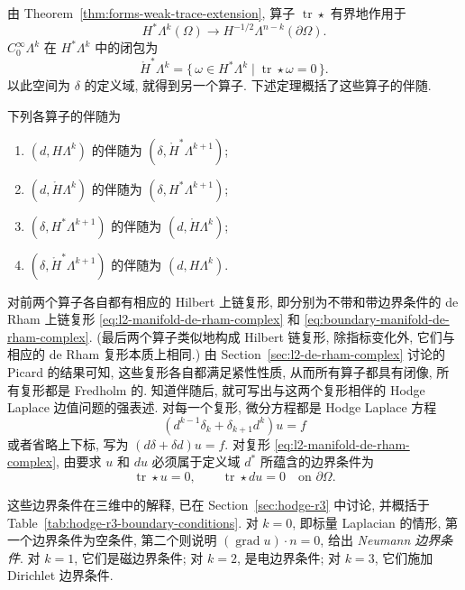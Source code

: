 {由 Theorem~\ref{thm:forms-weak-trace-extension}, 算子 $\operatorname{tr}\star$ 有界地作用于}
\[
H^*\Lambda^k(\Omega)\to H^{-1/2}\Lambda^{n-k}(\partial\Omega).
\]
{$C_0^\infty\Lambda^k$ 在 $H^*\Lambda^k$ 中的闭包为}
\[
\mathring H^*\Lambda^k=\{\,\omega\in H^*\Lambda^k\mid\operatorname{tr}\star\omega=0\,\}.
\]
{以此空间为 $\delta$ 的定义域, 就得到另一个算子. 下述定理概括了这些算子的伴随.}


\begin{Theorem}\label{thm:exterior-codifferential-adjoints}
{下列各算子的伴随为}
\begin{enumerate}
\item{$(d,H\Lambda^k)$ 的伴随为 $(\delta,\mathring H^*\Lambda^{k+1})$;}
\item{$(d,\mathring H\Lambda^k)$ 的伴随为 $(\delta,H^*\Lambda^{k+1})$;}
\item{$(\delta,H^*\Lambda^{k+1})$ 的伴随为 $(d,\mathring H\Lambda^k)$;}
\item{$(\delta,\mathring H^*\Lambda^{k+1})$ 的伴随为 $(d,H\Lambda^k)$.}
\end{enumerate}
\end{Theorem}

{对前两个算子各自都有相应的 Hilbert 上链复形, 即分别为不带和带边界条件的 de Rham 上链复形 \eqref{eq:l2-manifold-de-rham-complex} 和 \eqref{eq:boundary-manifold-de-rham-complex}. (最后两个算子类似地构成 Hilbert 链复形, 除指标变化外, 它们与相应的 de Rham 复形本质上相同.) 由 Section~\ref{sec:l2-de-rham-complex} 讨论的 Picard 的结果可知, 这些复形各自都满足紧性性质, 从而所有算子都具有闭像, 所有复形都是 Fredholm 的. 知道伴随后, 就可写出与这两个复形相伴的 Hodge Laplace 边值问题的强表述. 对每一个复形, 微分方程都是 Hodge Laplace 方程}
\[
(d^{k-1}\delta_k+\delta_{k+1}d^k)u=f
\]
{或者省略上下标, 写为 $(d\delta+\delta d)u=f$. 对复形 \eqref{eq:l2-manifold-de-rham-complex}, 由要求 $u$ 和 $du$ 必须属于定义域 $d^*$ 所蕴含的边界条件为}
\[
\operatorname{tr}\star u=0,\qquad\operatorname{tr}\star du=0\quad\text{on }\partial\Omega.
\]

{这些边界条件在三维中的解释, 已在 Section~\ref{sec:hodge-r3} 中讨论, 并概括于 Table~\ref{tab:hodge-r3-boundary-conditions}. 对 $k=0$, 即标量 Laplacian 的情形, 第一个边界条件为空条件, 第二个则说明 $(\operatorname{grad}u)\cdot n=0$, 给出 \emph{Neumann 边界条件}. 对 $k=1$, 它们是磁边界条件; 对 $k=2$, 是电边界条件; 对 $k=3$, 它们施加 Dirichlet 边界条件.}

